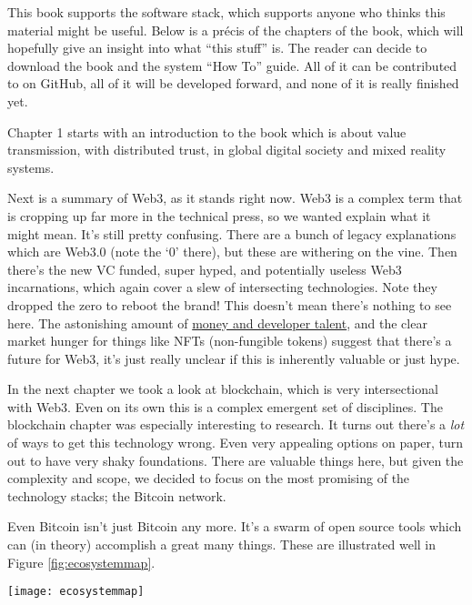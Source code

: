 This book supports the software stack, which supports anyone who thinks this material might be useful. Below is a précis of the chapters of the book, which will hopefully give an insight into what ``this stuff'' is. The reader can decide to download the book and the system ``How To'' guide. All of it can be contributed to on GitHub, all of it will be developed forward, and none of it is really finished yet.\par
Chapter 1 starts with an introduction to the book which is about value transmission, with distributed trust, in global digital society and mixed reality systems. \par
Next is a summary of Web3, as it stands right now. Web3 is a complex term that is cropping up far more in the technical press, so we wanted explain what it might mean. It’s still pretty confusing. There are a bunch of legacy explanations which are Web3.0 (note the `0' there), but these are withering on the vine. Then there’s the new VC funded, super hyped, and potentially useless Web3 incarnations, which again cover a slew of intersecting technologies. Note they dropped the zero to reboot the brand! This doesn’t mean there’s nothing to see here. The astonishing amount of \href{https://mirror.xyz/tr3butor.eth/AlZPMq_syymAoi8M1VVb2xES9Twj1OeetJbEE7EWhiw}{money and developer talent}, and the clear market hunger for things like NFTs (non-fungible tokens) suggest that there’s a future for Web3, it’s just really unclear if this is inherently valuable or just hype.\par
In the next chapter we took a look at blockchain, which is very intersectional with Web3. Even on its own this is a complex emergent set of disciplines. The blockchain chapter was especially interesting to research. It turns out there’s a \textit{lot} of ways to get this technology wrong. Even very appealing options on paper, turn out to have very shaky foundations. There are valuable things here, but given the complexity and scope, we decided to focus on the most promising of the technology stacks; the Bitcoin network.\par
Even Bitcoin isn’t just Bitcoin any more. It’s a swarm of open source tools which can (in theory) accomplish a great many things. These are illustrated well in Figure \ref{fig:ecosystemmap}. 
\begin{figure*}[ht]\centering %
	\texttt{[image: ecosystemmap]}
	\caption{The Open Source Map of The Bitcoin Protocol Ecosystem \href{https://www.ekosys.org/}{maintained by Lucas Nuzzi} of Coinmetrics}
	\label{fig:ecosystemmap}
\end{figure*}
